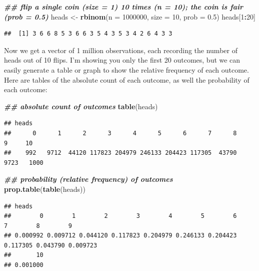 \documentclass[
]{book}
\newenvironment{Shaded}{\begin{snugshade}}{\end{snugshade}}
\newcommand{\AttributeTok}[1]{\textcolor[rgb]{0.13,0.29,0.53}{#1}}
\newcommand{\DecValTok}[1]{\textcolor[rgb]{0.00,0.00,0.81}{#1}}
\newcommand{\DocumentationTok}[1]{\textcolor[rgb]{0.56,0.35,0.01}{\textbf{\textit{#1}}}}
\newcommand{\FloatTok}[1]{\textcolor[rgb]{0.00,0.00,0.81}{#1}}
\newcommand{\FunctionTok}[1]{\textcolor[rgb]{0.13,0.29,0.53}{\textbf{#1}}}
\newcommand{\NormalTok}[1]{#1}
\newcommand{\OtherTok}[1]{\textcolor[rgb]{0.56,0.35,0.01}{#1}}
\newcommand{\SpecialCharTok}[1]{\textcolor[rgb]{0.81,0.36,0.00}{\textbf{#1}}}
\begin{document}
\begin{Shaded}
\begin{Highlighting}[]
\DocumentationTok{\#\# flip a single coin (size = 1) 10 times (n = 10); the coin is fair (prob = 0.5)}
\NormalTok{heads }\OtherTok{\textless{}{-}} \FunctionTok{rbinom}\NormalTok{(}\AttributeTok{n =} \DecValTok{1000000}\NormalTok{, }\AttributeTok{size =} \DecValTok{10}\NormalTok{, }\AttributeTok{prob =} \FloatTok{0.5}\NormalTok{)}
\NormalTok{heads[}\DecValTok{1}\SpecialCharTok{:}\DecValTok{20}\NormalTok{]}
\end{Highlighting}
\end{Shaded}

\begin{verbatim}
##  [1] 3 6 6 8 5 3 6 6 3 5 4 3 5 3 4 2 6 4 3 3
\end{verbatim}

Now we get a vector of 1 million observations, each recording the number of heads out of 10 flips. I'm showing you only the first 20 outcomes, but we can easily generate a table or graph to show the relative frequency of each outcome. Here are tables of the absolute count of each outcome, as well the probability of each outcome:

\begin{Shaded}
\begin{Highlighting}[]
\DocumentationTok{\#\# absolute count of outcomes}
\FunctionTok{table}\NormalTok{(heads)}
\end{Highlighting}
\end{Shaded}

\begin{verbatim}
## heads
##      0      1      2      3      4      5      6      7      8      9     10 
##    992   9712  44120 117823 204979 246133 204423 117305  43790   9723   1000
\end{verbatim}

\begin{Shaded}
\begin{Highlighting}[]
\DocumentationTok{\#\# probability (relative frequency) of outcomes}
\FunctionTok{prop.table}\NormalTok{(}\FunctionTok{table}\NormalTok{(heads))}
\end{Highlighting}
\end{Shaded}

\begin{verbatim}
## heads
##        0        1        2        3        4        5        6        7        8        9 
## 0.000992 0.009712 0.044120 0.117823 0.204979 0.246133 0.204423 0.117305 0.043790 0.009723 
##       10 
## 0.001000
\end{verbatim}
\end{document}

